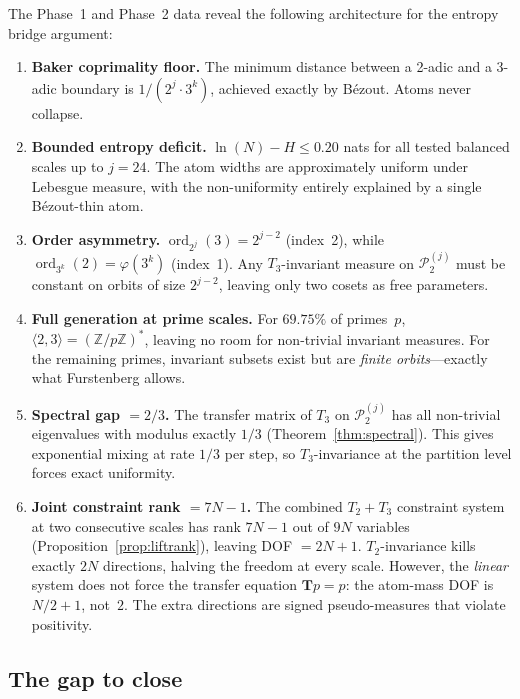 \documentclass[11pt,a4paper]{article}
\DeclareMathOperator{\ord}{ord}
\begin{document}
The Phase~1 and Phase~2 data reveal the following architecture for
the entropy bridge argument:

\begin{enumerate}
\item \textbf{Baker coprimality floor.}
  The minimum distance between a 2-adic and a 3-adic boundary is
  $1 / (2^j \cdot 3^k)$, achieved exactly by B\'ezout.
  Atoms never collapse.

\item \textbf{Bounded entropy deficit.}
  $\ln(N) - H \leq 0.20$ nats for all tested balanced scales up to
  $j = 24$.
  The atom widths are approximately uniform under Lebesgue measure,
  with the non-uniformity entirely explained by a single B\'ezout-thin atom.

\item \textbf{Order asymmetry.}
  $\ord_{2^j}(3) = 2^{j-2}$ (index~2), while $\ord_{3^k}(2) = \varphi(3^k)$ (index~1).
  Any $T_3$-invariant measure on $\mathcal{P}_2^{(j)}$ must be constant
  on orbits of size $2^{j-2}$, leaving only two cosets as free parameters.

\item \textbf{Full generation at prime scales.}
  For $69.75\%$ of primes~$p$, $\langle 2, 3 \rangle = (\mathbb{Z}/p\mathbb{Z})^*$,
  leaving no room for non-trivial invariant measures.
  For the remaining primes, invariant subsets exist but are
  \emph{finite orbits}---exactly what Furstenberg allows.

\item \textbf{Spectral gap $= 2/3$.}
  The transfer matrix of $T_3$ on $\mathcal{P}_2^{(j)}$ has all
  non-trivial eigenvalues with modulus exactly $1/3$
  (Theorem~\ref{thm:spectral}).
  This gives exponential mixing at rate $1/3$ per step,
  so $T_3$-invariance at the partition level forces exact uniformity.

\item \textbf{Joint constraint rank $= 7N - 1$.}
  The combined $T_2 + T_3$ constraint system at two consecutive
  scales has rank $7N - 1$ out of $9N$ variables
  (Proposition~\ref{prop:liftrank}), leaving DOF $= 2N + 1$.
  $T_2$-invariance kills exactly $2N$ directions, halving the
  freedom at every scale.
  However, the \emph{linear} system does not force the transfer
  equation $\mathbf{T}p = p$: the atom-mass DOF is $N/2 + 1$,
  not~$2$.
  The extra directions are signed pseudo-measures that violate
  positivity.
\end{enumerate}

\subsection{The gap to close}
\end{document}
